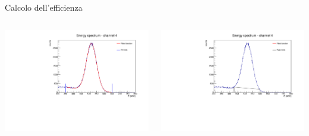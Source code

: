 \documentclass [xcolor=svgnames] {beamer}
\begin{document}
\begin{frame}{Calcolo dell'efficienza}
	\begin{columns}
		\begin{column}{0.5\textwidth}
			\includegraphics[width=\textwidth]{img/parameter.pdf}
		\end{column}
		\begin{column}{0.5\textwidth}
			\includegraphics[width=\textwidth]{img/trapezoid.pdf}
		\end{column}
	\end{columns}
\end{frame}
\end{document}
